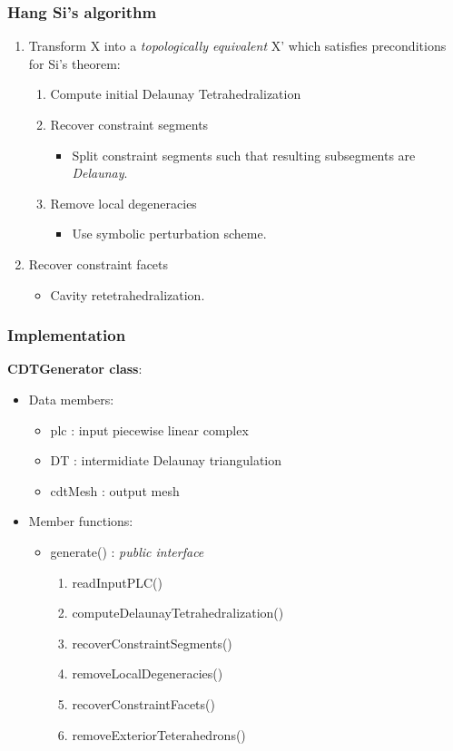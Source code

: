 \documentclass{beamer}
\begin{document}
	\begin{frame}
		\frametitle{Hang Si's algorithm} 
			\begin{enumerate}
				\item Transform X into a \textit{topologically equivalent} X' which satisfies preconditions for Si's theorem:	
				\begin{enumerate}
					\item Compute initial Delaunay Tetrahedralization	
					\item Recover constraint segments
						\begin{itemize}
							\item Split constraint segments such that resulting subsegments are \textit{Delaunay}.	
						\end{itemize}	
					\item Remove local degeneracies
						\begin{itemize}
							\item Use symbolic perturbation scheme.
						\end{itemize}		
				\end{enumerate}
				\item Recover constraint facets
					\begin{itemize}
						\item Cavity retetrahedralization.	
					\end{itemize}		
			\end{enumerate}		
	\end{frame}
	\begin{frame}
		\frametitle{Implementation}
			\textbf{CDTGenerator class}:
				\begin{itemize}
					\item Data members:
						\begin{itemize}
							\item plc : input piecewise linear complex
							\item DT : intermidiate Delaunay triangulation
							\item cdtMesh : output mesh	
						\end{itemize}
					\item Member functions: 
						\begin{itemize}
							\item generate() : \textit{public interface}
								\begin{enumerate}
									\item readInputPLC()
									\item computeDelaunayTetrahedralization()
									\item recoverConstraintSegments()
									\item removeLocalDegeneracies()
									\item recoverConstraintFacets()
									\item removeExteriorTeterahedrons()	
								\end{enumerate}
						\end{itemize}
				\end{itemize}
	\end{frame}	
\end{document}
